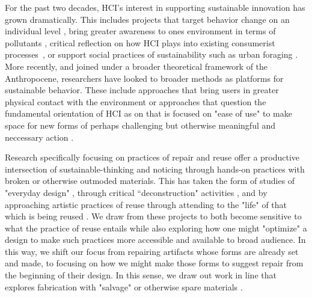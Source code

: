 For the past two decades, HCI's interest in supporting sustainable innovation has grown dramatically. This includes projects that target behavior change on an individual level \cite{disalvo_mapping_2010, dourish_hci_2010}, bring greater awareness to ones environment in terms of pollutants \cite{kim_wearair:_2010, da_costa_interspecies_nodate, aoki_vehicle_2009}, critical reflection on how HCI plays into existing consumerist processes~\cite{blevis_sustainable_2007, pan_fashion_2014,raghavan_means_2017}, or support social practices of sustainability such as urban foraging \cite{disalvo_fruit_2017}. More recently, and joined under a broader theoretical framework of the Anthropocene, researchers have looked to broader methods as platforms for sustainable behavior. These include approaches that bring users in greater physical contact with the environment \cite{liu_design_nodate, kuznetsov_nurturing_2011, light_design_2017} or approaches that question the fundamental orientation of HCI as on that is focused on "ease of use" \cite{light_design_2017} to make space for new forms of perhaps challenging but otherwise meaningful and neccessary action \cite{devendorf_hci-amusement_2019, Dew:2018:MWL:3232617.3232626, Dew:2019:DWS:3322276.3322320}.

Research specifically focusing on practices of repair and reuse \cite{jackson_repair_2012, Dew:2019:DWS:3322276.3322320, Dew:2018:LWC:3173574.3174159, Wyche_postcolonialphone, Wakkary_greendesignfiction, Tsaknaki_thingsfallapart} offer a productive intersection of sustainable-thinking and noticing through hands-on practices with broken or otherwise outmoded materials. This has taken the form of studies of "everyday design" \cite{Wakkary:2009:SIC:1518701.1518761, Maestri:2011:URC:2069618.2069633}, through critical ``deconstruction" activities \cite{Murer:2018:MTA:3196709.3196806, Murer:2015:DID:2882850.2882860, Murer:2017:UDE:3024969.3024993}
, and by approaching artistic practices of reuse through attending to the "life" of that which is being reused \cite{jackson_breakdown_2014}. We draw from these projects to both become sensitive to what the practice of reuse entails while also exploring how one might "optimize" a design to make such practices more accessible and available to broad audience. In this way, we shift our focus from repairing artifacts whose forms are already set and made, to focusing on how we might make those forms to suggest repair from the beginning of their design. In this sense, we draw out work in line that explores fabrication with "salvage" \cite{Dew:2019:DWS:3322276.3322320} or otherwise spare materials \cite{devendorf_being_2015,KovacsTrussFormer}. 


